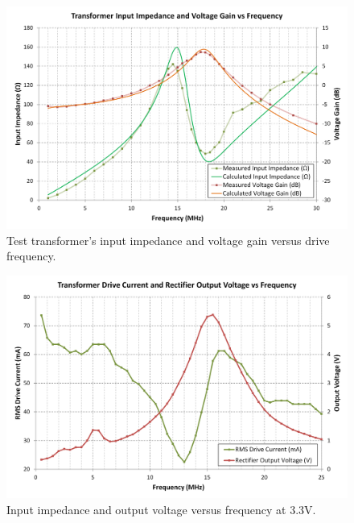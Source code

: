 \documentclass[conference]{IEEEtran}
\begin{document}
	\begin{figure}[t]
		\centering
		\includegraphics[width=1.0\columnwidth]{./img/NoRectTF}
		\caption{Test transformer's input impedance and voltage gain versus drive frequency.}
		\label{fig:NoRect}
	\end{figure}

	\begin{figure}[t]
		\centering
		\includegraphics[width=1\columnwidth]{./img/ZandVoutVsF_3V3}
		\caption{Input impedance and output voltage versus frequency at 3.3V.}
		\label{fig:ZandVvsF}
	\end{figure}
	
\end{document}
